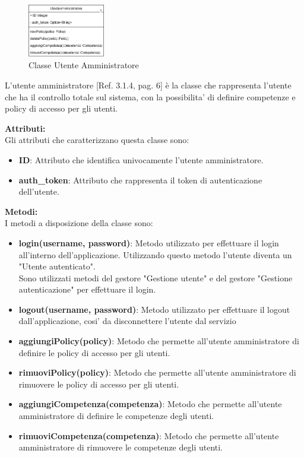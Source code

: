 \documentclass{article}
\begin{document}
\begin{figure}[htbp]
    \centering
    \includegraphics[width=0.3\textwidth]{Images/utenteAmministratore_class.png}
    \caption{Classe Utente Amministratore}
    \label{fig:utente_amministratore}
\end{figure}

L'utente amministratore [Ref. 3.1.4, pag. 6] è la classe che rappresenta l'utente che ha il controllo totale sul sistema, con la possibilita' di definire competenze e policy di accesso per gli utenti.

\textbf{Attributi:}\\
Gli attributi che caratterizzano questa classe sono:
\begin{itemize}
    \item \textbf{ID}: Attributo che identifica univocamente l'utente amministratore.
    \item \textbf{auth\_token}: Attributo che rappresenta il token di autenticazione dell'utente.
\end{itemize}

\textbf{Metodi:}\\
I metodi a disposizione della classe sono:

\begin{itemize}
    \item \textbf{login(username, password)}: Metodo utilizzato per effettuare il login all'interno dell'applicazione. Utilizzando questo metodo l'utente diventa un "Utente autenticato".\\Sono utilizzati metodi del gestore "Gestione utente" e del gestore "Gestione autenticazione" per effettuare il login.
    \item \textbf{logout(username, password)}: Metodo utilizzato per effettuare il logout dall'applicazione, cosi' da disconnettere l'utente dal servizio
    \item \textbf{aggiungiPolicy(policy)}: Metodo che permette all'utente amministratore di definire le policy di accesso per gli utenti.
    \item \textbf{rimuoviPolicy(policy)}: Metodo che permette all'utente amministratore di rimuovere le policy di accesso per gli utenti.
    \item \textbf{aggiungiCompetenza(competenza)}: Metodo che permette all'utente amministratore di definire le competenze degli utenti.
    \item \textbf{rimuoviCompetenza(competenza)}: Metodo che permette all'utente amministratore di rimuovere le competenze degli utenti.
\end{itemize}
\end{document}
